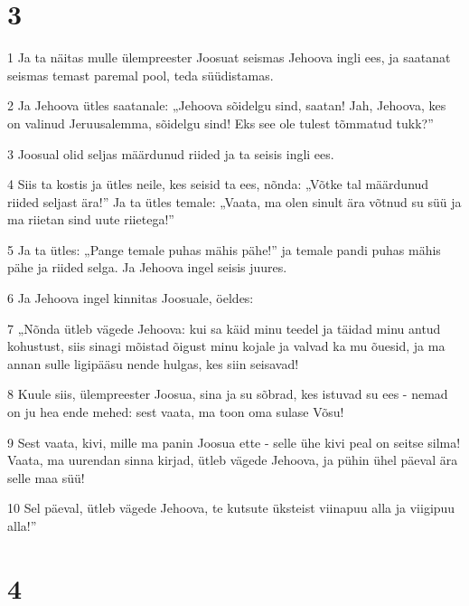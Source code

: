 \chapter{3}

\par 1 Ja ta näitas mulle ülempreester Joosuat seismas Jehoova ingli ees, ja saatanat seismas temast paremal pool, teda süüdistamas.
\par 2 Ja Jehoova ütles saatanale: „Jehoova sõidelgu sind, saatan! Jah, Jehoova, kes on valinud Jeruusalemma, sõidelgu sind! Eks see ole tulest tõmmatud tukk?”
\par 3 Joosual olid seljas määrdunud riided ja ta seisis ingli ees.
\par 4 Siis ta kostis ja ütles neile, kes seisid ta ees, nõnda: „Võtke tal määrdunud riided seljast ära!” Ja ta ütles temale: „Vaata, ma olen sinult ära võtnud su süü ja ma riietan sind uute riietega!”
\par 5 Ja ta ütles: „Pange temale puhas mähis pähe!” ja temale pandi puhas mähis pähe ja riided selga. Ja Jehoova ingel seisis juures.
\par 6 Ja Jehoova ingel kinnitas Joosuale, öeldes:
\par 7 „Nõnda ütleb vägede Jehoova: kui sa käid minu teedel ja täidad minu antud kohustust, siis sinagi mõistad õigust minu kojale ja valvad ka mu õuesid, ja ma annan sulle ligipääsu nende hulgas, kes siin seisavad!
\par 8 Kuule siis, ülempreester Joosua, sina ja su sõbrad, kes istuvad su ees - nemad on ju hea ende mehed: sest vaata, ma toon oma sulase Võsu!
\par 9 Sest vaata, kivi, mille ma panin Joosua ette - selle ühe kivi peal on seitse silma! Vaata, ma uurendan sinna kirjad, ütleb vägede Jehoova, ja pühin ühel päeval ära selle maa süü!
\par 10 Sel päeval, ütleb vägede Jehoova, te kutsute üksteist viinapuu alla ja viigipuu alla!”


\chapter{4}

